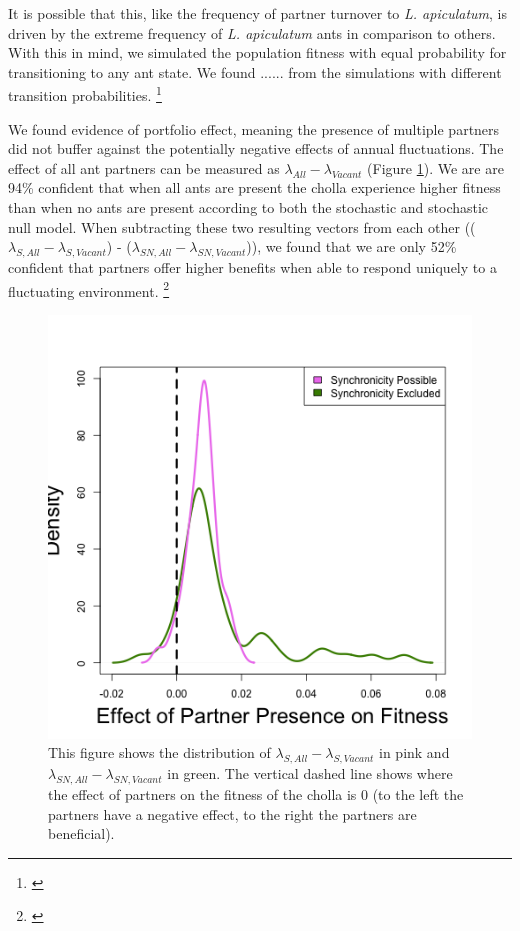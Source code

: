 \documentclass[11pt]{article}
\newcommand{\ali}[2]{{\color{blue}{#1}}\footnote{\textit{\color{blue}{#2}}}}
\begin{document}
It is possible that this, like the frequency of partner turnover to \textit{L. apiculatum}, is driven by the extreme frequency of \textit{L. apiculatum} ants in comparison to others. 
With this in mind, we simulated the population fitness with equal probability for transitioning to any ant state.
We found ...... from the simulations with different transition probabilities.
\ali{}{This feels like the most natural progression to me.}

We found evidence of portfolio effect, meaning the presence of multiple partners did not buffer against the potentially negative effects of annual fluctuations.
The effect of all ant partners can be measured as $\lambda_{All} - \lambda_{Vacant}$ (Figure \ref{fig:Portfolio}).
We are are 94\% confident that when all ants are present the cholla experience higher fitness than when no ants are present according to both the stochastic and stochastic null model. 
When subtracting these two resulting vectors from each other (($\lambda_{S,All} - \lambda_{S,Vacant}$) - ($\lambda_{SN,All} - \lambda_{SN,Vacant}$)), we found that we are only 52\% confident that partners offer higher benefits when able to respond uniquely to a fluctuating environment. 
\ali{There is no real difference between the two scenarios, meaning we have no evidence of portfolio effect.}{I am not sure if I have explained enough here honestly.}

\begin{figure}
	\includegraphics[width=\linewidth]{Figures/portfolio_effect.png}
	\caption{This figure shows the distribution of $\lambda_{S,All}-\lambda_{S,Vacant}$ in pink and $\lambda_{SN,All}-\lambda_{SN,Vacant}$ in green. The vertical dashed line shows where the effect of partners on the fitness of the cholla is 0 (to the left the partners have a negative effect, to the right the partners are beneficial).}
	\label{fig:Portfolio}
\end{figure}
\end{document}
